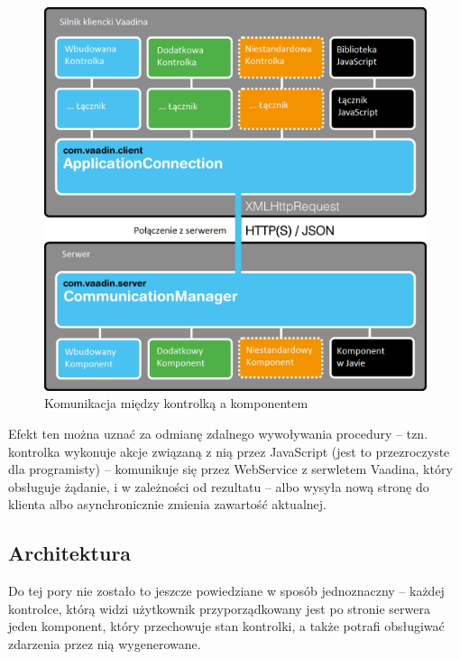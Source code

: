 \begin{figure} [H]
    \begin{center}
	\includegraphics[scale=.3]{img/client.png}
	\caption{Komunikacja między kontrolką a komponentem}
	\label{architekturaVaadin}
    \end{center}
\end{figure}

Efekt ten można uznać za odmianę zdalnego wywoływania procedury – tzn. kontrolka wykonuje akcje związaną z nią przez JavaScript (jest to przezroczyste dla programisty) – komunikuje się przez WebService z serwletem Vaadina, który obsługuje żądanie, i w zależności od rezultatu – albo wysyła nową stronę do klienta albo asynchronicznie zmienia zawartość aktualnej.

\subsection{Architektura}
Do tej pory nie zostało to jeszcze powiedziane w sposób jednoznaczny – każdej kontrolce, którą widzi użytkownik przyporządkowany jest po stronie serwera jeden komponent, który przechowuje stan kontrolki, a także potrafi obsługiwać zdarzenia przez nią wygenerowane. 

